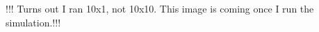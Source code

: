 \documentclass[a4paper, 10pt]{article}
\theoremstyle{plain}
\begin{document}
!!! Turns out I ran 10x1, not 10x10. This image is coming once I run the 
simulation.!!!
% 
\end{document}
